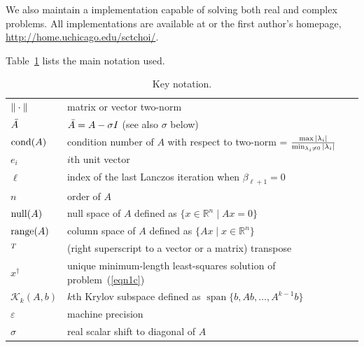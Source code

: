 \documentclass{doc_acmtrans2m}
\begin{document}
We also maintain a \MATLAB implementation
capable of solving both real and complex problems.  All
implementations are available at \hbox{} 
or the first author's homepage, \url{http://home.uchicago.edu/sctchoi/}.

Table~\ref{table-notation} lists the main notation used.



\begin{table}[hb]   %
{\fontsize{10pt}{11}\selectfont
\caption{Key notation.}
\label{table-notation}
\begin{center}

  \begin{tabular}{|l|l|}
    \hline
     $\norm{\cdot}$         & matrix or vector two-norm
   \\[.5ex] $\Abar$         & $\Abar = A - \sigma I$ (see also $\sigma$ below)
   \\ $\cond(A)$            & condition number of $A$ with respect
                             to two-norm = $\smash[b]{\frac{\max
                             |\lambda_i|}{\min_{\lambda_i \neq 0}
                             |\lambda_i|}}$
   \\ $e_i$                 & $i$th unit vector
   \\ $\ell$                & index of the last Lanczos iteration when $\beta_{\ell+1} = 0$
   \\ $n$                   & order of $A$
   \\ $\Null(A)$            & null space of $A$ defined as
                              $\{x \in \mathbb{R}^n \mid Ax = 0 \}$
   \\ $\range(A)$           & column space of $A$ defined as
                              $\{Ax \mid x \in \mathbb{R}^n\}$                            
   \\ $\T$                  & (right superscript to a vector or a matrix) transpose
   \\ $x^{\dagger}$         & unique minimum-length least-squares solution of problem~(\ref{eqn1c}) 
   \\ $\mathcal{K}_k(A,b)$  & $k$th Krylov subspace defined as
                              $\operatorname*{span}
                             \{b, Ab, \ldots, A^{k-1}b\}$                            
   \\ $\varepsilon$         & machine precision
   \\ $\sigma$              & real scalar shift to diagonal of $A$
   \\[3pt] \hline
  \end{tabular}
\end{center}
}
\end{table}
\end{document}
